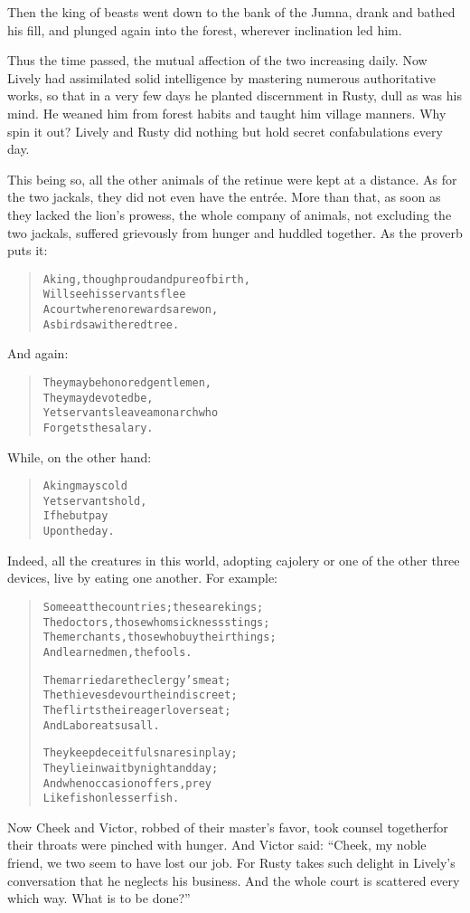 \documentclass[article, twoside, 14pt]{memoir}
\renewenvironment{verbatim}{%
\begin{quote}%
\vskip -10pt%
\begin{alltt}\normalfont\large}{\end{alltt}%
\end{quote}%
\vskip -10pt
} %
\begin{document}
Then the king of beasts went down to the bank of the Jumna, drank
and bathed his fill, and plunged again into the forest, wherever
inclination led him.

Thus the time passed, the mutual affection of the two increasing
daily. Now Lively had assimilated solid intelligence by mastering
numerous authoritative works, so that in a very few days he planted
discernment in Rusty, dull as was his mind. He weaned him from
forest habits and taught him village manners. Why spin it out?
Lively and Rusty did nothing but hold secret confabulations every
day.

This being so, all the other animals of the retinue were kept at a
distance. As for the two jackals, they did not even have the
entrée. More than that, as soon as they lacked the lion's
prowess, the whole company of animals, not excluding the two
jackals, suffered grievously from hunger and huddled together. As
the proverb puts it:

\begin{verbatim}
A king, though proud and pure of birth,
    Will see his servants flee
A court where no rewards are won,
    As birds a withered tree.
\end{verbatim}
And again:

\begin{verbatim}
They may be honored gentlemen,
    They may devoted be,
Yet servants leave a monarch who
    Forgets the salary.
\end{verbatim}
While, on the other hand:

\begin{verbatim}
A king may scold
Yet servants hold,
If he but pay
Upon the day.
\end{verbatim}
Indeed, all the creatures in this world, adopting cajolery or one
of the other three devices, live by eating one another. For
example:

\begin{verbatim}
Some eat the countries; these are kings;
The doctors, those whom sickness stings;
The merchants, those who buy their things;
And learned men, the fools.

The married are the clergy's meat;
The thieves devour the indiscreet;
The flirts their eager lovers eat;
And Labor eats us all.

They keep deceitful snares in play;
They lie in wait by night and day;
And when occasion offers, prey
Like fish on lesser fish.
\end{verbatim}
Now Cheek and Victor, robbed of their master's favor, took counsel
together{\textemdash}for their throats were pinched with hunger. And Victor
said:
``Cheek, my noble friend, we two seem to have lost our job. For Rusty takes such delight in Lively's conversation that he neglects his business. And the whole court is scattered every which way. What is to be done?''
\end{document}
